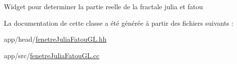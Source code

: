 Widget pour determiner la partie reelle de la fractale julia et fatou 

La documentation de cette classe a été générée à partir des fichiers suivants \+:\begin{DoxyCompactItemize}
\item 
app/head/\hyperlink{fenetreJuliaFatouGL_8hh}{fenetre\+Julia\+Fatou\+G\+L.\+hh}\item 
app/src/\hyperlink{fenetreJuliaFatouGL_8cc}{fenetre\+Julia\+Fatou\+G\+L.\+cc}\end{DoxyCompactItemize}
